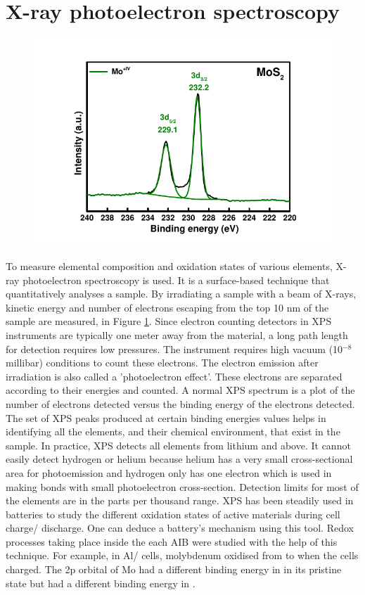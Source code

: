 \section{X-ray photoelectron spectroscopy}
\begin{figure}[tbh!]
\centering
\includegraphics[width=\textwidth]{Figures/chap2fig/XPS}
\caption{}
\label{Figures/chap2fig:XPS}
\end{figure}
To measure elemental composition and oxidation states of various elements, X-ray photoelectron spectroscopy is used. It is a surface-based technique that quantitatively analyses a sample. By irradiating a sample with a beam of X-rays, kinetic energy and number of electrons escaping from the top 10 nm of the sample are measured, in Figure \ref{Figures/chap2fig:XPS}. Since  electron counting detectors in XPS instruments are typically one meter away from the material, a long path length for detection requires low pressures. The instrument requires high vacuum (10$^{-8}$ millibar) conditions to count these electrons. The electron emission after irradiation is also called a 'photoelectron effect'. These electrons are separated according to their energies and counted. A normal XPS spectrum is a plot of the number of electrons detected versus the binding energy of the electrons detected. The set of XPS peaks produced at certain binding energies values helps in identifying all the elements, and their chemical environment, that exist in the sample. In practice, XPS detects all elements from lithium and above. It cannot easily detect hydrogen or helium because helium has a very small cross-sectional area for photoemission and hydrogen only has one electron which is used in making bonds with  small photoelectron cross-section. Detection limits for most of the elements are in the parts per thousand range. XPS has been steadily used in batteries to study the different oxidation states of active materials during cell charge/ discharge. One can deduce a battery's mechanism using this tool.
Redox processes taking place inside the each AIB were studied with the help of this technique. For example, in Al/ cells, molybdenum oxidised from  to  when the cells charged. The 2p orbital of Mo had a different binding energy in  in its pristine state but had a different binding energy in . 
